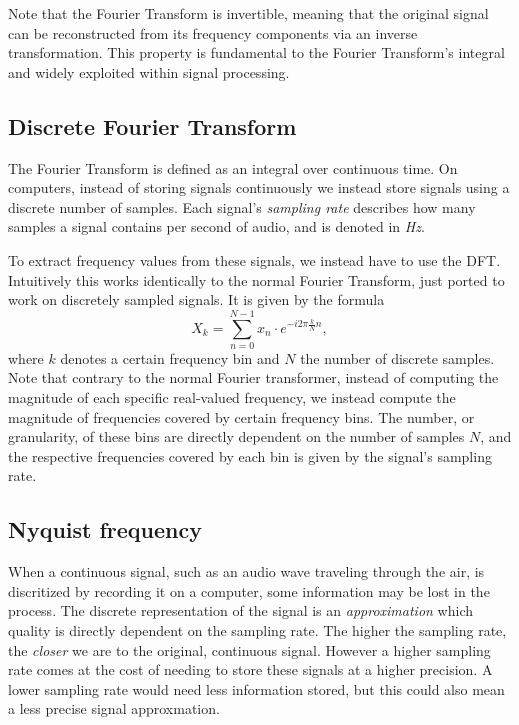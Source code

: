 Note that the Fourier Transform is invertible, meaning that the original signal can be reconstructed from its frequency components via an inverse transformation. This property is fundamental to the Fourier Transform's integral and widely exploited within signal processing.

\subsection{Discrete Fourier Transform}

The Fourier Transform is defined as an integral over continuous time. On computers, instead of storing signals continuously we instead store signals using a discrete number of samples. Each signal's \textit{sampling rate} describes how many samples a signal contains per second of audio, and is denoted in \textit{Hz}.

To extract frequency values from these signals, we instead have to use the \gls{DFT}. Intuitively this works identically to the normal Fourier Transform, just ported to work on discretely sampled signals. It is given by the formula \[ X_k = \sum^{N - 1}_{n=0}{x_n \cdot e^{-i 2\pi \frac{k}{N} n}}, \] where $k$ denotes a certain frequency bin and $N$ the number of discrete samples. Note that contrary to the normal Fourier transformer, instead of computing the magnitude of each specific real-valued frequency, we instead compute the magnitude of frequencies covered by certain frequency bins. The number, or granularity, of these bins are directly dependent on the number of samples $N$, and the respective frequencies covered by each bin is given by the signal's sampling rate.

\subsection{Nyquist frequency}

When a continuous signal, such as an audio wave traveling through the air, is discritized by recording it on a computer, some information may be lost in the process. The discrete representation of the signal is an \textit{approximation} which quality is directly dependent on the sampling rate. The higher the sampling rate, the \textit{closer} we are to the original, continuous signal. However a higher sampling rate comes at the cost of needing to store these signals at a higher precision. A lower sampling rate would need less information stored, but this could also mean a less precise signal approxmation.

